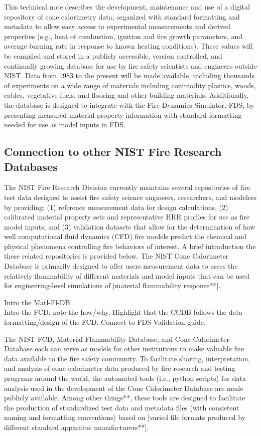 This technical note describes the development, maintenance and use of a digital repository of cone calorimetry data, organized with standard formatting and metadata to allow easy access to experimental measurements and derived properties (e.g., heat of combustion, ignition and fire growth parameters, and average burning rate in response to known heating conditions). These values will be compiled and stored in a publicly accessible, version controlled, and continually growing database for use by fire safety scientists and engineers outside NIST. Data from 1983 to the present will be made available, including thousands of experiments on a wide range of materials including commodity plastics, woods, cables, vegetative fuels, and flooring and other building materials. Additionally, the database is designed to integrate with the Fire Dynamics Simulator, FDS, by presenting measured material property information with standard formatting needed for use as model inputs in FDS. 

\subsection{Connection to other NIST Fire Research Databases} \label{ssec:intro-databases}
The NIST Fire Research Division currently maintains several repositories of fire test data designed to assist fire safety science engineers, researchers, and modelers by providing: (1) reference measurement data for design calculations, (2) calibrated material property sets and representative HRR profiles for use as fire model inputs, and (3) validation datasets that allow for the determination of how well computational fluid dynamics (CFD) fire models predict the chemical and physical phenomena controlling fire behaviors of interest. A brief introduction the these related repositories is provided below.  The NIST Cone Calorimeter Database is primarily designed to offer users measurement data to asses the relatively flammability of different materials and model inputs that can be used for engineering-level simulations of [material flammability response**].


Intro the Matl-Fl-DB. \\

Intro the FCD, note the how/why. Highlight that the CCDB follows the data formatting/design of the FCD.
Connect to FDS Validation guide.



The NIST FCD, Material Flammability Database, and Cone Calorimeter Database each can serve as models for other institutions to make valuable fire data available to the fire safety community. To facilitate sharing, interpretation, and analysis of cone calorimeter data produced by fire research and testing programs around the world, the automated tools (i.e., python scripts) for data analysis used in the development of the Cone Calorimeter Database are made publicly available. Among other things**, these tools are designed to facilitate the production of standardized test data and metadata files (with consistent naming and formatting conventions) based on [varied file formats produced by different standard apparatus manufacturers**].